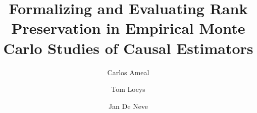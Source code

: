 \documentclass[ASNA,twocolumn]{USG}
\title{Formalizing and Evaluating Rank Preservation in Empirical Monte Carlo Studies of Causal Estimators}
\author{Carlos Ameal}
\author{Tom Loeys}
\author{Jan De Neve}
\begin{document}
\maketitle










\clearpage
\onecolumn
\appendix

\end{document}
